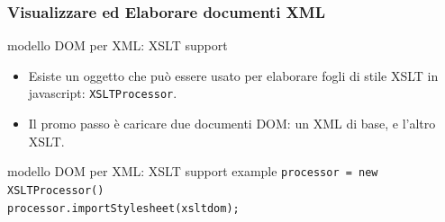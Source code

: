 \begin{frame}
    \frametitle{Visualizzare ed Elaborare documenti XML}
    \addtocounter{nframe}{1}
    

    \begin{block}{modello DOM per XML: XSLT support}
        \begin{itemize}
            \item Esiste un oggetto che può essere usato per elaborare fogli di stile XSLT in javascript: \texttt{XSLTProcessor}.
            \item Il promo passo è caricare due documenti DOM: un XML di base, e l'altro XSLT.
        \end{itemize}
    \end{block}

    \begin{block}{modello DOM per XML: XSLT support example}
         \texttt{processor = new XSLTProcessor()} 
         \\\texttt{processor.importStylesheet(xsltdom);}
         \\
    \end{block}
     
\end{frame}

